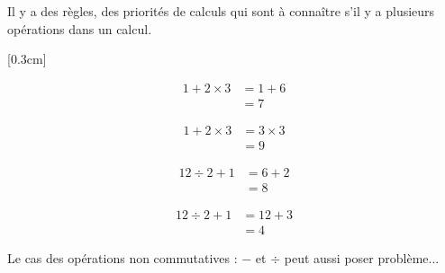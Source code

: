 \documentclass[11pt]{article}
\begin{document}
Il y a des règles, des priorités de calculs qui sont à connaître s'il y a plusieurs opérations dans un calcul. 

\begin{center}
\reversemarginpar\marginnote{$\Box \Box$}
\reversemarginpar\marginnote{$\Box \Box$}[0.3cm]
     \\
\end{center} \vspace{-1cm}


\begin{minipage}[t]{0.5\textwidth}

\begin{align*}
1 + 2 \times 3 &= 1 + 6 \\
               &= 7
\end{align*}

\end{minipage}\begin{minipage}[t]{0.5\textwidth}

\begin{align*}
1 + 2 \times 3 &= 3 \times 3 \\
               &= 9
\end{align*}

\end{minipage}

\begin{minipage}[t]{0.5\textwidth}

\begin{align*}
12 \div 2 + 1 &= 6 + 2 \\
              &= 8
\end{align*}

\end{minipage}\begin{minipage}[t]{0.5\textwidth}

\begin{align*}
12 \div 2 + 1 &= 12 + 3 \\
              &= 4
\end{align*}

\end{minipage}

Le cas des opérations non commutatives : $-$ et $\div$ peut aussi poser problème... \\

\begin{center}
    \reversemarginpar\marginnote{$\Box \Box$}
\end{center}  \vspace{-1cm}
\end{document}
